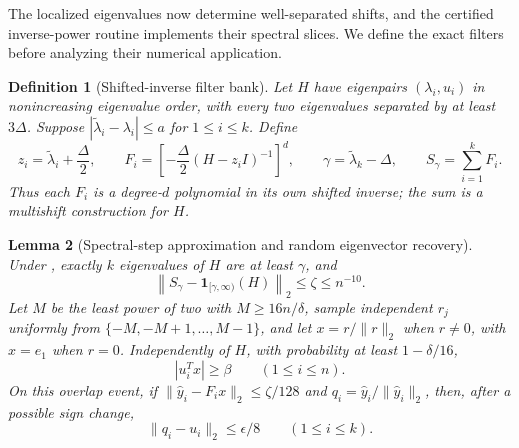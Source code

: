 \documentclass[11pt]{article}
\newtheorem{lemma}{Lemma}[section]
\newtheorem{definition}[lemma]{Definition}
\begin{document}
The localized eigenvalues now determine well-separated shifts, and the
certified inverse-power routine implements their spectral slices.  We define
the exact filters before analyzing their numerical application.

\begin{definition}[Shifted-inverse filter bank]
\label{def:filter-bank}
Let $H$ have eigenpairs $(\lambda_i,u_i)$ in nonincreasing eigenvalue order,
with every two eigenvalues separated by at least $3\Delta$.  Suppose
$|\widetilde\lambda_i-\lambda_i|\leq a$ for $1\leq i\leq k$.  Define
\begin{equation}
 \label{eq:filter-bank-definition}
 z_i=\widetilde\lambda_i+\frac\Delta2,
 \qquad
 F_i=\left[-\frac\Delta2(H-z_iI)^{-1}\right]^d,
 \qquad
 \gamma=\widetilde\lambda_k-\Delta,
 \qquad
 S_\gamma=\sum_{i=1}^kF_i.
\end{equation}
Thus each $F_i$ is a degree-$d$ polynomial in its own shifted inverse; the
sum is a multishift construction for $H$.
\end{definition}

\begin{lemma}[Spectral-step approximation and random eigenvector recovery]
\label{lem:filter-bank}
Under , exactly $k$ eigenvalues of $H$ are at least
$\gamma$, and
\[
 \left\lVert S_\gamma-\mathbf 1_{[\gamma,\infty)}(H)\right\rVert_2
 \leq\zeta\leq n^{-10}.
\]
Let $M$ be the least power of two with $M\geq16n/\delta$, sample independent
$r_j$ uniformly from $\{-M,-M+1,\ldots,M-1\}$, and let
$x=r/\lVert r\rVert_2$ when $r\ne0$, with $x=e_1$ when $r=0$.
Independently of $H$, with probability at least $1-\delta/16$,
\[
 |u_i^Tx|\geq\beta\qquad(1\leq i\leq n).
\]
On this overlap event, if
$\lVert\widehat y_i-F_ix\rVert_2\leq\zeta/128$ and
$q_i=\widehat y_i/\lVert\widehat y_i\rVert_2$, then, after a possible sign
change,
\begin{equation}
 \label{eq:eigenvector-recovery}
 \lVert q_i-u_i\rVert_2\leq\epsilon/8
 \qquad(1\leq i\leq k).
\end{equation}
\end{lemma}
\end{document}
